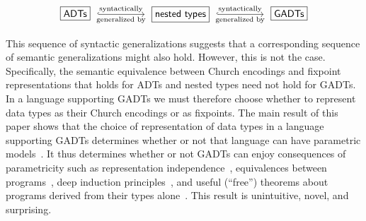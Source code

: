 \documentclass[submission,copyright,creativecommons]{eptcs}
\begin{document}
\vspace*{-0.1in}

\[\begin{tikzcd}[column sep = huge]
\text{\fbox{$\mathsf{ADTs}$}}\;
\ar[r,hookrightarrow,"\text{syntactically}","\text{generalized by}"']
& \;\text{\fbox{$\mathsf{nested~types}$}}\; \ar[r,hookrightarrow,"\text{syntactically}","\text{generalized by}"']
& \;\text{\fbox{$\mathsf{GADTs}$}}
\end{tikzcd}\]

\vspace*{-0.05in}

\noindent
This sequence of syntactic generalizations suggests that a
corresponding sequence of semantic generalizations might also hold.
However, this is not the case. Specifically, the semantic equivalence
between Church encodings and fixpoint representations that holds for
ADTs and nested types need not hold for GADTs. In a language
supporting GADTs we must therefore choose whether to represent data
types as their Church encodings or as fixpoints.  The main result of
this paper shows that the choice of representation of data types in a
language supporting GADTs determines whether or not that language can
have parametric models~\cite{rey83}. It thus determines whether or not
GADTs can enjoy consequences of parametricity such as representation
independence~\cite{adr09,dnb12}, equivalences between
programs~\cite{hd11}, deep induction principles~\cite{jgj21s,jp20},
and useful (``free'') theorems about programs derived from their types
alone~\cite{wad89}.  This result is unintuitive, novel, and
surprising.
\end{document}

